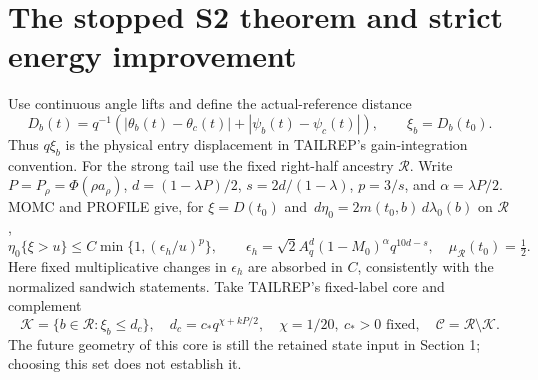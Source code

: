 \documentclass[11pt]{article}
\theoremstyle{remark}\newtheorem{remark}[theorem]{Remark}
\newcommand{\dd}{\,d}
\newcommand{\KK}{\mathcal K}
\newcommand{\RR}{\mathcal R}
\begin{document}
\section{The stopped S2 theorem and strict energy improvement}
Use continuous angle lifts and define the actual-reference distance
\[
 D_b(t)=q^{-1}(|\theta_b(t)-\theta_c(t)|+|\psi_b(t)-\psi_c(t)|),
 \qquad \xi_b=D_b(t_0).
\]
Thus $q\xi_b$ is the physical entry displacement in TAILREP's
gain-integration convention. For the strong tail use the fixed
right-half ancestry $\RR$.
Write $P=P_\rho=\Phi(\rho a_\rho)$,
$d=(1-\lambda P)/2$, $s=2d/(1-\lambda)$, $p=3/s$, and
$\alpha=\lambda P/2$. MOMC and PROFILE give, for
$\xi=D(t_0)$ and $\dd\eta_0=2m(t_0,b)\dd\lambda_0(b)$ on $\RR$,
\begin{equation}
 \eta_0\{\xi>u\}\le C\min\{1,(\epsilon_h/u)^p\},\qquad
 \epsilon_h=\sqrt2 A_q^d(1-M_0)^\alpha q^{10d-s},
 \quad\mu_{\RR}(t_0)=\tfrac12.
 \label{an03s2cpv1:strongentry}
\end{equation}
Here fixed multiplicative changes in $\epsilon_h$ are absorbed
in $C$, consistently with the normalized sandwich statements.
Take TAILREP's fixed-label core and complement
\begin{equation}
 \KK=\{b\in\RR:\xi_b\le d_c\},\quad
 d_c=c_*q^{\chi+kP/2},\quad \chi=1/20,\ c_*>0\text{ fixed},
 \quad \mathcal C=\RR\setminus\KK.
 \label{an03s2cpv1:cutoff}
\end{equation}
The future geometry of this core is still the retained state
input in Section 1; choosing this set does not establish it.
\end{document}
